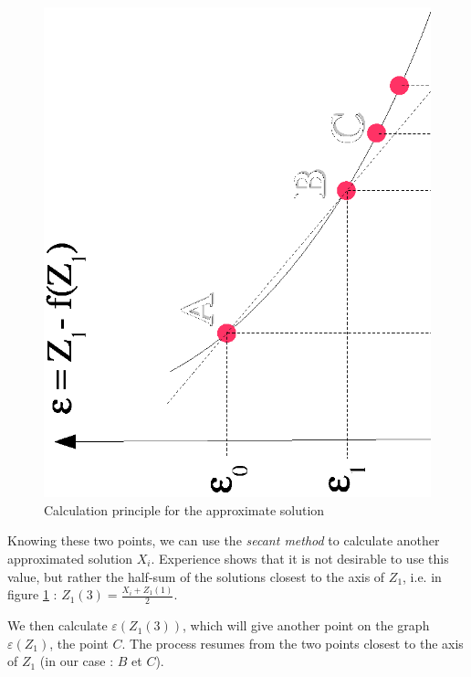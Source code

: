 \begin{figure}
 \begin{center}
  \includegraphics[scale=0.8,angle=270]{Figures/Princ_Cal_Sol_Apr.eps}
  \vspace{1.5cm}
  \caption{Calculation principle for the approximate solution}
  \label{calsolapproc}
 \end{center}
\end{figure}

\vspace{0.5cm}

Knowing these two points, we can use the \textit{secant method} to calculate another approximated solution $X_i$. Experience shows that it is not desirable to use this value, but rather the half-sum of the solutions closest to the axis of $Z_1$, i.e. in figure \ref{calsolapproc} : $Z_{1}(3) = \frac{X_i + Z_{1}(1)}{2}$.

\vspace{0.5cm}

We then calculate $\varepsilon(Z_{1}(3))$, which will give another point on the graph $\varepsilon(Z_1)$, the point $C$. The process resumes from the two points closest to the axis of $Z_1$ (in our case : $B$ et $C$).

